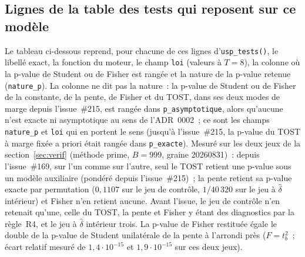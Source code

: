 \documentclass[a4paper,11pt]{article}
\newcommand{\code}[1]{\texttt{\small #1}}
\begin{document}
\subsection{Lignes de la table des tests qui reposent sur ce modèle}
\label{sec:modele-auxiliaire-lignes}

Le tableau ci-dessous reprend, pour chacune de ces lignes d'\code{usp\_tests()}, le libellé exact,
la fonction du moteur, le champ \code{loi} (valeurs à $T = 8$), la colonne où la p-value de
Student ou de Fisher est rangée et la nature de la p-value retenue (\code{nature\_p}). La colonne
ne dit pas la nature~: la p-value de Student ou de Fisher de la constante, de la pente, de Fisher
et du TOST, dans ses deux modes de marge depuis l'issue~\#215, est rangée dans
\code{p\_asymptotique}, alors qu'aucune n'est exacte ni asymptotique au sens de l'ADR~0002~; ce
sont les champs \code{nature\_p} et \code{loi} qui en portent le sens (jusqu'à l'issue~\#215, la
p-value du TOST à marge fixée a priori était rangée dans \code{p\_exacte}). Mesuré sur les deux
jeux de la section~\ref{sec:verif} (méthode prime, $B = 999$, graine 20260831)~: depuis
l'issue~\#169, sur l'un comme sur l'autre, seul le TOST retient une p-value sous un modèle
auxiliaire (pondéré depuis l'issue~\#215)~; la pente retient sa p-value exacte par permutation ($0{,}1107$ sur le jeu de
contrôle, $1/40\,320$ sur le jeu à $\hat\delta$ intérieur) et Fisher n'en retient aucune. Avant
l'issue, le jeu de contrôle n'en retenait qu'une, celle du TOST, la pente et Fisher y étant des
diagnostics par la règle~R4, et le jeu à $\hat\delta$ intérieur trois. La p-value de Fisher
restituée égale le double de la p-value de Student unilatérale de la pente à l'arrondi près
($F = t_b^2$~; écart relatif mesuré de $1{,}4\cdot 10^{-15}$ et $1{,}9\cdot 10^{-15}$ sur ces deux
jeux).
\end{document}
